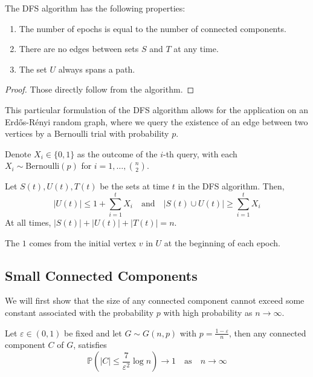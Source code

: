 \documentclass{article}
\begin{document}
\begin{proposition}
    The DFS algorithm has the following properties:
    \begin{enumerate}
        \item The number of epochs is equal to the number of connected components.
        \item There are no edges between sets $S$ and $T$ at any time.
        \item The set $U$ always spans a path.
    \end{enumerate}
\end{proposition}

\begin{proof}
    Those directly follow from the algorithm.
\end{proof}

This particular formulation of the DFS algorithm allows for the application on an Erd\H{o}s-R\'{e}nyi random graph, where we query the existence of an edge between two vertices by a Bernoulli trial with probability $p$.  

Denote $X_i\in \{0,1\}$ as the outcome of the $i$-th query, with each $X_i \sim \text{Bernoulli}(p)$ for $i=1, \ldots, \binom{n}{2}$. 

\begin{proposition}
    Let $S(t), U(t), T(t)$ be the sets at time $t$ in the DFS algorithm. Then, 
    \begin{equation*}
        |U(t)|\leq1+\sum_{i=1}^{t}X_{i} \quad \mathrm{and} \quad |S(t)\cup U(t)|\geq\sum_{i=1}^{t}X_{i}
    \end{equation*}
    At all times, $|S(t)|+|U(t)|+|T(t)|=n$.
\end{proposition}

The $1$ comes from the initial vertex $v$ in $U$ at the beginning of each epoch. 

\subsection{Small Connected Components}

We will first show that the size of any connected component cannot exceed some constant associated with the probability $p$ with high probability as $n\to \infty$.  

\begin{theorem}\label{thm:small_connected_components}
    Let $\varepsilon \in (0,1)$ be fixed and let $G\sim G(n,p)$ with $p=\frac{1-\varepsilon}{n}$, then any connected component $C$ of $G$, satisfies
    \begin{equation*}
        \mathbb{P}(|C|\leq \frac{7}{\varepsilon^2}\log n)\to 1 \quad \text{as} \quad n\to \infty
    \end{equation*}
\end{theorem}
\end{document}
